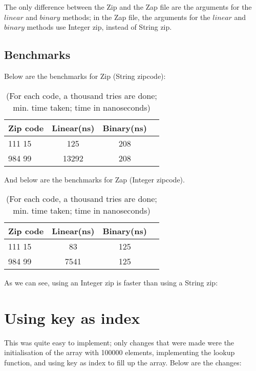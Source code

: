 \documentclass[a4paper,11pt]{article}
\begin{document}
The only difference between the Zip and the Zap file are the arguments for the $linear$ and $binary$ methods; in the Zap file, the arguments for the $linear$ and $binary$ methods use Integer zip, instead of String zip.

\subsection*{Benchmarks}
Below are the benchmarks for Zip (String zipcode):

\begin{table}[h]
\begin{center}
\begin{tabular}{l|c|c|c}
\textbf{Zip code} & \textbf{Linear(ns)} & \textbf{Binary(ns)}\\
\hline
  111 15      &  125     &  208\\
  984 99      &  13292     &  208\\
\end{tabular}
\caption{(For each code, a thousand tries are done; min. time taken; time in nanoseconds)}
\label{tab:table1}
\end{center}
\end{table}

And below are the benchmarks for Zap (Integer zipcode).

\begin{table}[h]
\begin{center}
\begin{tabular}{l|c|c|c}
\textbf{Zip code} & \textbf{Linear(ns)} & \textbf{Binary(ns)}\\
\hline
  111 15      &  83     &  125\\
  984 99      &  7541     &  125\\
\end{tabular}
\caption{(For each code, a thousand tries are done; min. time taken; time in nanoseconds)}
\label{tab:table1}
\end{center}
\end{table}

As we can see, using an Integer zip is faster than using a String zip:


\section*{Using key as index}
This was quite easy to implement; only changes that were made were the initialisation of the array with 100000 elements, implementing the lookup function, and using key as index to fill up the array. Below are the changes:
\end{document}
